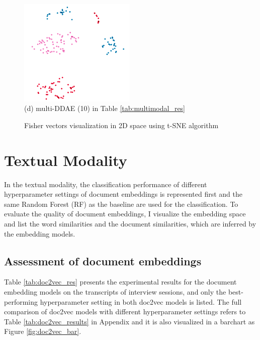 \begin{figure}[htb]
\begin{minipage}[c]{0.4\linewidth}
    \centering
    \includegraphics[height=5.1cm]{images/results/multi_DDAE_eGeMAPS_tsne.png} \\
    (d) multi-DDAE (10) in Table \ref{tab:multimodal_res}
    \end{minipage}
    \caption{Fisher vectors visualization in 2D space using t-SNE algorithm}
    \label{fig:tsne_DDAEs}
\end{figure}



\section{Textual Modality}

In the textual modality, the classification performance of different hyperparameter settings of document embeddings is represented first and the same Random Forest (RF) as the baseline are used for the classification. To evaluate the quality of document embeddings, I visualize the embedding space and list the word similarities and the document similarities, which are inferred by the embedding models. 

\subsection{Assessment of document embeddings}

Table \ref{tab:doc2vec_res} presents the experimental results for the document embedding models on the transcripts of interview sessions, and only the best-performing hyperparameter setting in both doc2vec models is listed. The full comparison of doc2vec models with different hyperparameter settings refers to Table \ref{tab:doc2vec_results} in Appendix and it is also visualized in a barchart as Figure \ref{fig:doc2vec_bar}.  


